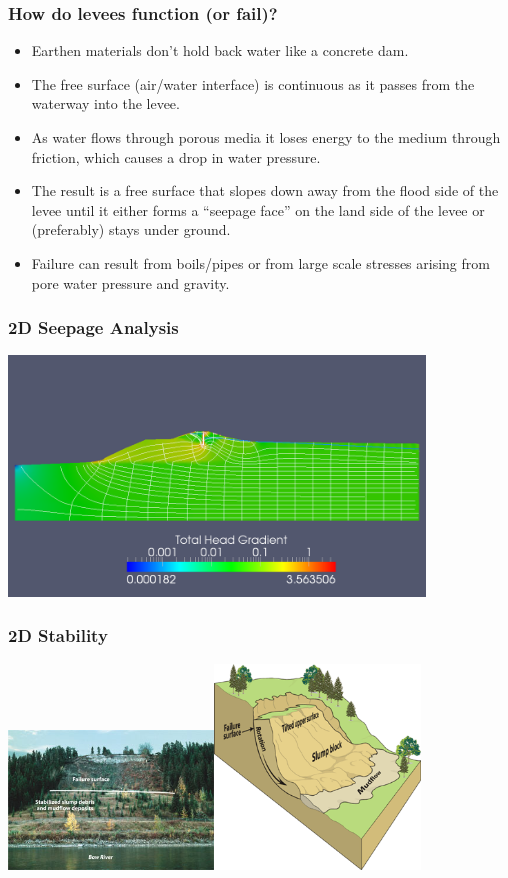 \documentclass{beamer}
\begin{document}
\begin{frame}
  \frametitle{How do levees function (or fail)?}
    \begin{itemize}
    \item Earthen materials don't hold back water like a
      concrete dam.
    \item The free surface (air/water interface) is continuous as it
      passes from the waterway into the levee.
    \item As water flows through porous media it loses energy to the
      medium through friction, which causes a drop in water pressure.
    \item The result is a free surface that slopes down away from the
      flood side of the levee until it either forms a ``seepage face''
      on the land side of the levee or (preferably) stays under ground.
    \item Failure can result from boils/pipes or from large scale
      stresses arising from pore water pressure and gravity.
    \end{itemize}
\end{frame}

\begin{frame}
\frametitle{2D Seepage Analysis}
\includegraphics[width=4.35in]{sacSteady30.png}
\end{frame}  

\begin{frame}
\frametitle{2D Stability}
\includegraphics[width=2.15in]{wildwood_e.jpg}\includegraphics[width=2.15in]{slopes_e.png}
\end{frame}  
\end{document}
